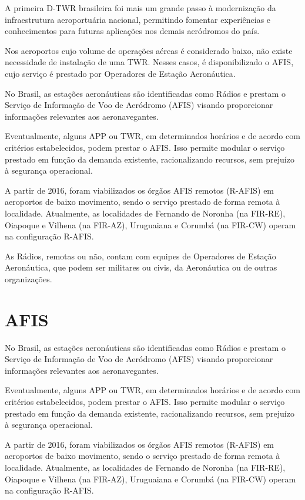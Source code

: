\documentclass[
]{book}
\theoremstyle{definition}
\theoremstyle{definition}
\theoremstyle{definition}
\theoremstyle{definition}
\theoremstyle{remark}
\begin{document}
A primeira D-TWR brasileira foi mais um grande passo à modernização da infraestrutura aeroportuária nacional, permitindo fomentar experiências e conhecimentos para futuras aplicações nos demais aeródromos do país.

Nos aeroportos cujo volume de operações aéreas é considerado baixo, não existe necessidade de instalação de uma TWR. Nesses casos, é disponibilizado o AFIS, cujo serviço é prestado por Operadores de Estação Aeronáutica.

No Brasil, as estações aeronáuticas são identificadas como Rádios e prestam o Serviço de Informação de Voo de Aeródromo (AFIS) visando proporcionar informações relevantes aos aeronavegantes.

Eventualmente, alguns APP ou TWR, em determinados horários e de acordo com critérios estabelecidos, podem prestar o AFIS. Isso permite modular o serviço prestado em função da demanda existente, racionalizando recursos, sem prejuízo à segurança operacional.

A partir de 2016, foram viabilizados os órgãos AFIS remotos (R-AFIS) em aeroportos de baixo movimento, sendo o serviço prestado de forma remota à localidade. Atualmente, as localidades de Fernando de Noronha (na FIR-RE), Oiapoque e Vilhena (na FIR-AZ), Uruguaiana e Corumbá (na FIR-CW) operam na configuração R-AFIS.

As Rádios, remotas ou não, contam com equipes de Operadores de Estação Aeronáutica, que podem ser militares ou civis, da Aeronáutica ou de outras organizações.

\hypertarget{afis}{%
\section{AFIS}\label{afis}}

No Brasil, as estações aeronáuticas são identificadas como Rádios e prestam o Serviço de Informação de Voo de Aeródromo (AFIS) visando proporcionar informações relevantes aos aeronavegantes.

Eventualmente, alguns APP ou TWR, em determinados horários e de acordo com critérios estabelecidos, podem prestar o AFIS. Isso permite modular o serviço prestado em função da demanda existente, racionalizando recursos, sem prejuízo à segurança operacional.

A partir de 2016, foram viabilizados os órgãos AFIS remotos (R-AFIS) em aeroportos de baixo movimento, sendo o serviço prestado de forma remota à localidade. Atualmente, as localidades de Fernando de Noronha (na FIR-RE), Oiapoque e Vilhena (na FIR-AZ), Uruguaiana e Corumbá (na FIR-CW) operam na configuração R-AFIS.
\end{document}
